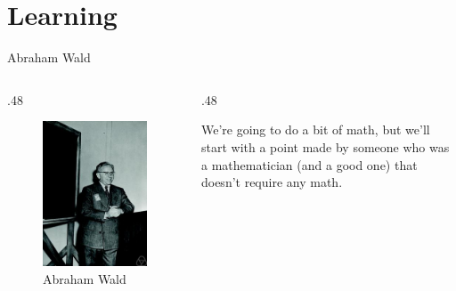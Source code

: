 \documentclass[
  ignorenonframetext,
]{beamer}
\renewcommand{\,}{\text{, }}
\def\begincols{\begin{columns}}
\def\begincol{\begin{column}}
\def\endcol{\end{column}}
\def\endcols{\end{columns}}
\begin{document}
\hypertarget{learning}{%
\section{Learning}\label{learning}}

\begin{frame}{Abraham Wald}
\protect\hypertarget{abraham-wald}{}

\begincols
\begincol{.48\textwidth}

\begin{figure}
\centering
\includegraphics{../images/class10/wald_photo.jpg}
\caption{Abraham Wald}
\end{figure}

\endcol
\begincol{.48\textwidth}

We're going to do a bit of math, but we'll start with a point made by
someone who was a mathematician (and a good one) that doesn't require
any math.

\endcol
\endcols

\end{frame}
\end{document}
